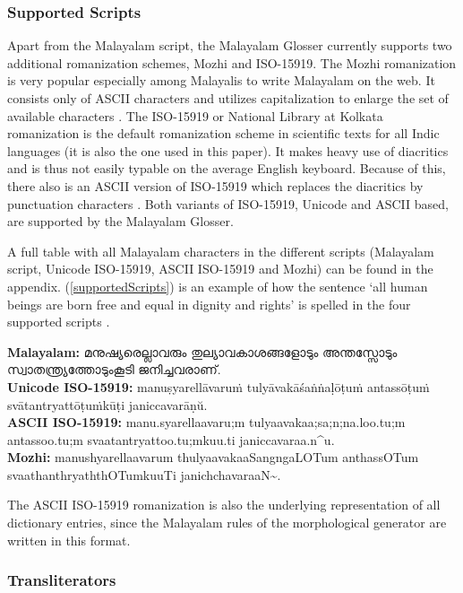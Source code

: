 \documentclass[a4paper]{article}
\begin{document}
\subsubsection{Supported Scripts}\label{scripts}

Apart from the Malayalam script, the Malayalam Glosser currently supports two additional romanization schemes, Mozhi and ISO-15919. The Mozhi romanization is very popular especially among Malayalis to write Malayalam on the web. It consists only of ASCII characters and utilizes capitalization to enlarge the set of available characters \parencite{mozhi}. The ISO-15919 or National Library at Kolkata romanization is the default romanization scheme in scientific texts for all Indic languages (it is also the one used in this paper). It makes heavy use of diacritics and is thus not easily typable on the average English keyboard. Because of this, there also is an ASCII version of ISO-15919 which replaces the diacritics by punctuation characters \parencite{iso-15919}. Both variants of ISO-15919, Unicode and ASCII based, are supported by the Malayalam Glosser.

A full table with all Malayalam characters in the different scripts (Malayalam script, Unicode ISO-15919, ASCII ISO-15919 and Mozhi) can be found in the appendix. (\ref{supportedScripts}) is an example of how the sentence `all human beings are born free and equal in dignity and rights' is spelled in the four supported scripts \parencite{malOmniglot}.

\ex
\textbf{Malayalam:} മനുഷ്യരെല്ലാവരും തുല്യാവകാശങ്ങളോടും അന്തസ്സോടും സ്വാ\-ത\-ന്ത്ര്യ\-ത്തോ\-ടും\-കൂ\-ടി ജനിച്ചവരാണ്. \\[1ex]
\textbf{Unicode ISO-15919:} manuṣyarellāvaruṁ tulyāvakāśaṅṅaḷōṭuṁ antassōṭ\-uṁ svātantryattōṭuṁkūṭi janiccavarāṇŭ. \\[1ex]
\textbf{ASCII ISO-15919:} manu.syarellaavaru;m tulyaavakaa;sa;n;na.loo.tu;m antassoo.t\-u;m svaatantryattoo.tu;mkuu.ti janiccavaraa.n\^{}u. \\[1ex]
\textbf{Mozhi:} manushyarellaavarum thulyaavakaaSangngaLOTum anthassOT\-um svaathanthryaththOTumkuuTi janichchavaraaN\textasciitilde{}.
\label{supportedScripts}\xe

The ASCII ISO-15919 romanization is also the underlying representation of all dictionary entries, since the Malayalam rules of the morphological generator are written in this format.

\subsubsection{Transliterators}
\end{document}
